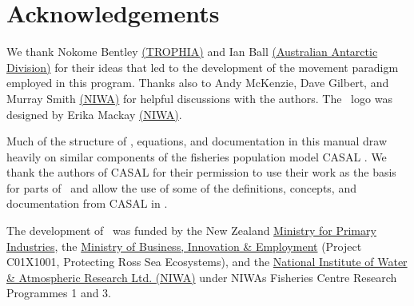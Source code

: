 \section{Acknowledgements\label{sec:acknowledgements}}

We thank Nokome Bentley \href{http://www.trophia.co.nz}{(TROPHIA)} and Ian Ball \href{http://www.aad.gov.au}{(Australian Antarctic Division)} for their ideas that led to the development of the movement paradigm employed in this program. Thanks also to Andy McKenzie, Dave Gilbert, and Murray Smith \href{http://www.niwa.co.nz}{(NIWA)} for helpful discussions with the authors. The \SPM\ logo was designed by Erika Mackay \href{http://www.niwa.co.nz}{(NIWA)}. 

Much of the structure of \SPM, equations, and documentation in this manual draw heavily on similar components of the fisheries population model CASAL \citep{1388}. We thank the authors of CASAL for their permission to use their work as the basis for parts of \SPM\ and allow the use of some of the definitions, concepts, and documentation from CASAL in \SPM. 

The development of \SPM\ was funded by the New Zealand \href{http://www.mpi.govt.nz}{Ministry for Primary Industries}, the \href{http://www.msi.govt.nz}{Ministry of Business, Innovation \& Employment} (Project C01X1001, Protecting Ross Sea Ecosystems), and the \href{http://www.niwa.co.nz}{National Institute of Water \& Atmospheric Research Ltd. (NIWA)} under NIWAs Fisheries Centre Research Programmes 1 and 3. 
